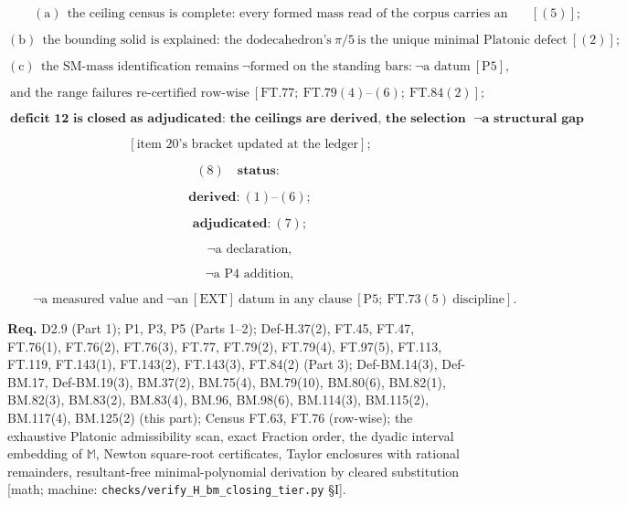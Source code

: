\documentclass[11pt,openany]{report}
\theoremstyle{canonplain}
\theoremstyle{canondef}
\begin{document}
\[
\qquad (\mathrm a)\ \ \text{the ceiling census is complete: every formed mass read of the corpus carries an exact range row}\ [(5)];
\]

\[
(\mathrm b)\ \ \text{the bounding solid is explained: the dodecahedron's}\ \pi/5\ \text{is the unique minimal Platonic defect}\ [(2)];
\]

\[
(\mathrm c)\ \ \text{the SM-mass identification remains}\ \neg\text{formed on the standing bars:}\ \neg\text{a datum}\ [\mathrm{P5}],
\]

\[
\ \text{and the range failures re-certified row-wise}\ [\mathrm{FT.77};\ \mathrm{FT.79}(4)\text{--}(6);\ \mathrm{FT.84}(2)];
\]

\[
\boxed{\ \textbf{deficit 12 is closed as adjudicated: the ceilings are derived, the selection is explained, and what stands is a calibration bar,}\ \neg\textbf{a structural gap}\ }
\]

\[
\qquad [\text{item 20's bracket updated at the ledger}];
\]

\[
(8)\quad\textbf{status:}
\]

\[
\qquad \textbf{derived:}\ (1)\text{--}(6);
\]

\[
\qquad \textbf{adjudicated:}\ (7);
\]

\[
\qquad \neg\text{a declaration},
\]

\[
\qquad \neg\text{a P4 addition},
\]

\[
\qquad \neg\text{a measured value and}\ \neg\text{an}\ [\mathrm{EXT}]\ \text{datum in any clause}\ [\mathrm{P5};\ \mathrm{FT.73}(5)\ \text{discipline}].
\]

\textbf{Req.} D2.9 (Part 1); P1, P3, P5 (Parts 1–2); Def-H.37(2), FT.45, FT.47, FT.76(1), FT.76(2), FT.76(3), FT.77, FT.79(2), FT.79(4), FT.97(5), FT.113, FT.119, FT.143(1), FT.143(2), FT.143(3), FT.84(2) (Part 3); Def-BM.14(3), Def-BM.17, Def-BM.19(3), BM.37(2), BM.75(4), BM.79(10), BM.80(6), BM.82(1), BM.82(3), BM.83(2), BM.83(4), BM.96, BM.98(6), BM.114(3), BM.115(2), BM.117(4), BM.125(2) (this part); Census FT.63, FT.76 (row-wise); the exhaustive Platonic admissibility scan, exact Fraction order, the dyadic interval embedding of $\mathbb M$, Newton square-root certificates, Taylor enclosures with rational remainders, resultant-free minimal-polynomial derivation by cleared substitution [math; machine: \texttt{checks/\allowbreak{}verify\_\allowbreak{}H\_\allowbreak{}bm\_\allowbreak{}closing\_\allowbreak{}tier.py} §I].
\end{document}
